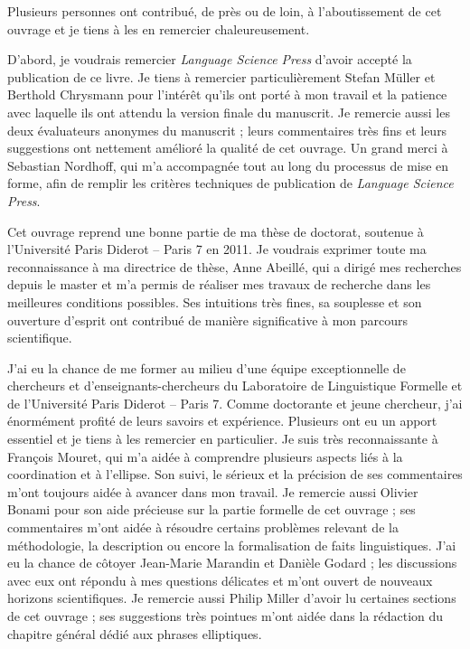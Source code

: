 
Plusieurs personnes ont contribué, de près ou de loin, à l’aboutissement de cet ouvrage et je tiens à les en remercier chaleureusement. 

D’abord, je voudrais remercier \textit{Language Science Press} d’avoir accepté la publication de ce livre. Je tiens à remercier particulièrement Stefan Müller et Berthold Chrysmann pour l’intérêt qu’ils ont porté à mon travail et la patience avec laquelle ils ont attendu la version finale du manuscrit. Je remercie aussi les deux évaluateurs anonymes du manuscrit ; leurs commentaires très fins et leurs suggestions ont nettement amélioré la qualité de cet ouvrage. Un grand merci à Sebastian Nordhoff, qui m’a accompagnée tout au long du processus de mise en forme, afin de remplir les critères techniques de publication de \textit{Language Science Press}.

Cet ouvrage reprend une bonne partie de ma thèse de doctorat, soutenue à l’Université Paris Diderot – Paris 7 en 2011. Je voudrais exprimer toute ma reconnaissance à ma directrice de thèse, Anne Abeillé, qui a dirigé mes recherches depuis le master et m’a permis de réaliser mes travaux de recherche dans les meilleures conditions possibles. Ses intuitions très fines, sa souplesse et son ouverture d’esprit ont contribué de manière significative à mon parcours scientifique. 

J’ai eu la chance de me former au milieu d’une équipe exceptionnelle de chercheurs et d’enseignants-chercheurs du Laboratoire de Linguistique Formelle et de l’Université Paris Diderot – Paris 7. Comme doctorante et jeune chercheur, j’ai énormément profité de leurs savoirs et expérience. Plusieurs ont eu un apport essentiel et je tiens à les remercier en particulier. Je suis très reconnaissante à François Mouret, qui m’a aidée à comprendre plusieurs aspects liés à la coordination et à l’ellipse. Son suivi, le sérieux et la précision de ses commentaires m’ont toujours aidée à avancer dans mon travail. Je remercie aussi Olivier Bonami pour son aide précieuse sur la partie formelle de cet ouvrage ; ses commentaires m’ont aidée à résoudre certains problèmes relevant de la méthodologie, la description ou encore la formalisation de faits linguistiques. J’ai eu la chance de côtoyer Jean-Marie Marandin et Danièle Godard ; les discussions avec eux ont répondu à mes questions délicates et m’ont ouvert de nouveaux horizons scientifiques. Je remercie aussi Philip Miller d’avoir lu certaines sections de cet ouvrage ; ses suggestions très pointues m’ont aidée dans la rédaction du chapitre général dédié aux phrases elliptiques.  

